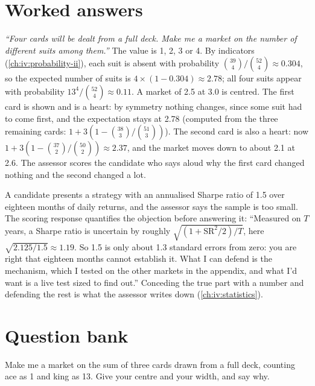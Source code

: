 \section{Worked answers}

\begin{example}\label{ex:iv:the-final-round-and-trading-games:suits}
\emph{``Four cards will be dealt from a full deck. Make me a market on the number of different suits among them.''}
The value is 1, 2, 3 or 4. By indicators (\cref{ch:iv:probability-ii}), each suit is absent with probability
$\binom{39}{4}/\binom{52}{4} \approx 0.304$, so the expected number of suits is $4 \times (1 - 0.304) \approx 2.78$; all
four suits appear with probability $13^4/\binom{52}{4} \approx 0.11$. A market of 2.5 at 3.0 is centred. The first card
is shown and is a heart: by symmetry nothing changes, since some suit had to come first, and the expectation stays at
2.78 (computed from the three remaining cards: $1 + 3(1 - \binom{38}{3}/\binom{51}{3})$). The second card is also a
heart: now $1 + 3(1 - \binom{37}{2}/\binom{50}{2}) \approx 2.37$, and the market moves down to about 2.1 at 2.6. The
assessor scores the candidate who says aloud why the first card changed nothing and the second changed a lot.
\end{example}

\begin{example}\label{ex:iv:the-final-round-and-trading-games:challenge}
A candidate presents a strategy with an annualised Sharpe ratio of 1.5 over eighteen months of daily returns, and the
assessor says the sample is too small. The scoring response quantifies the objection before answering it: ``Measured on $T$ years, a
Sharpe ratio is uncertain by roughly $\sqrt{(1 + \mathrm{SR}^2/2)/T}$, here $\sqrt{2.125/1.5} \approx 1.19$. So
1.5 is only about 1.3 standard errors from zero: you are right that eighteen months cannot establish it. What I can
defend is the mechanism, which I tested on the other markets in the appendix, and what I'd want is a live test sized to
find out.'' Conceding the true part with a number and defending the rest is what the assessor writes down
(\cref{ch:iv:statistics}).
\end{example}

\section{Question bank}

\begin{interviewq}\label{iq:iv:the-final-round-and-trading-games:1}
Make me a market on the sum of three cards drawn from a full deck, counting ace as 1 and king as 13. Give
your centre and your width, and say why.
\end{interviewq}

